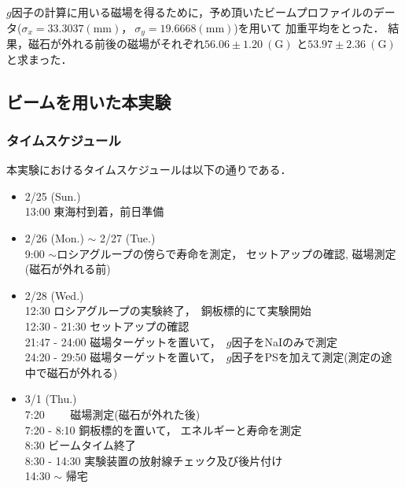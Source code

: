 $g$因子の計算に用いる磁場を得るために，予め頂いたビームプロファイルのデータ($\sigma_x=33.3037(\mathrm{mm})，\ \sigma_y=19.6668(\mathrm{mm})$)を用いて
加重平均をとった．
結果，磁石が外れる前後の磁場がそれぞれ$56.06\pm 1.20\  (\mathrm{G})$ と$53.97\pm 2.36\  (\mathrm{G})$ と求まった．
\newpage
\subsection{ビームを用いた本実験}
\subsubsection{タイムスケジュール}
本実験におけるタイムスケジュールは以下の通りである．
\begin{itemize}
\item 2/25 (Sun.)\\
  13:00   東海村到着，前日準備
\item 2/26 (Mon.) $\sim$ 2/27 (Tue.)\\
  9:00 $\sim$ロシアグループの傍らで寿命を測定， セットアップの確認, 磁場測定(磁石が外れる前)
\item 2/28 (Wed.)\\
  12:30   ロシアグループの実験終了，\ 銅板標的にて実験開始\\ %
  12:30 - 21:30 セットアップの確認\\
  21:47 - 24:00 磁場ターゲットを置いて，\ $g$因子をNaIのみで測定\\
  24:20 - 29:50 磁場ターゲットを置いて，\ $g$因子をPSを加えて測定(測定の途中で磁石が外れる)%
\item 3/1 (Thu.)\\
  7:20 　　磁場測定(磁石が外れた後)\\
  7:20 - 8:10 銅板標的を置いて， エネルギーと寿命を測定\\%
  8:30   ビームタイム終了\\%
  8:30 - 14:30 実験装置の放射線チェック及び後片付け \\%
  14:30 $\sim$ 帰宅
\end{itemize}

